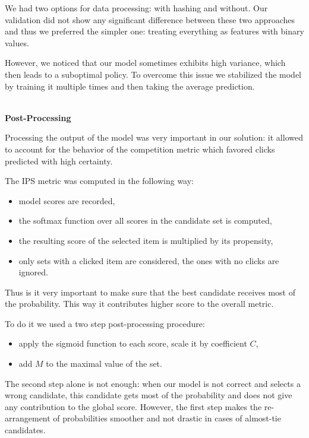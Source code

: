 \documentclass{sig-alternate}
\begin{document}
We had two options for data processing: with hashing and without. Our validation
did not show any significant difference between these two approaches and thus
we preferred the simpler one: treating everything as features with binary values.

However, we noticed that our model sometimes exhibits high variance, which 
then leads to a suboptimal policy. 
To overcome this issue we stabilized the model by 
training it multiple times and then taking the average prediction. 

\ \\ 

\textbf{Post-Processing}

Processing the output of the model was very important in our solution: 
it allowed to account for the behavior of the competition metric
which favored clicks predicted with high certainty. 

The IPS metric was computed in the following way:

\begin{itemize}
\item model scores are recorded,
\item the softmax function over all scores in the candidate set is computed,
\item the resulting score of the selected item is multiplied by its propensity,
\item only sets with a clicked item are considered, the ones with no clicks are ignored.
\end{itemize}

Thus is it very important to make sure that the best candidate receives most 
of the probability. This way it contributes higher score to the overall
metric.

To do it we used a two step post-processing procedure:

\begin{itemize}
\item apply the sigmoid function to each score, scale it by coefficient $C$,
\item add $M$ to the maximal value of the set.
\end{itemize}

The second step alone is not enough: when our model is not correct 
and selects a wrong candidate, this candidate gets most of the 
probability and does not give any contribution to the global score. 
However, the first step makes the re-arrangement of probabilities 
smoother and not drastic in cases of almost-tie candidates. 
\end{document}
